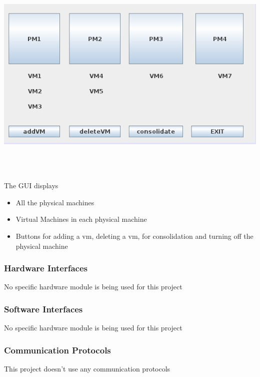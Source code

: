 \documentclass[a4paper,11pt]{article}
\begin{document}
			\includegraphics[height=10cm]{images/gui}
			\\
			\\
			The GUI displays 			
			\begin{itemize}
				\item All the physical machines
				\item Virtual Machines in each physical machine
				\item Buttons for adding a vm, deleting a vm, for consolidation and turning off 
				the physical machine
			\end{itemize}

			\subsubsection{Hardware Interfaces}
			No specific hardware module is being used for this project
			\subsubsection{Software Interfaces}
			No specific hardware module is being used for this project 
			\subsubsection{Communication Protocols}
			This project doesn’t use any communication protocols
\end{document}
